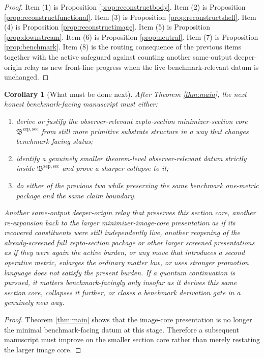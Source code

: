 \documentclass[11pt]{article}
\newcommand{\ZeptoMinSectionCore}{\mathfrak B^{\mathrm{zep,sec}}}
\newtheorem{corollary}{Corollary}
\begin{document}
\begin{proof}
Item (1) is Proposition \ref{prop:reconstructbody}. Item (2) is Proposition \ref{prop:reconstructfunctional}. Item (3) is Proposition \ref{prop:reconstructshell}. Item (4) is Proposition \ref{prop:reconstructimage}. Item (5) is Proposition \ref{prop:downstream}. Item (6) is Proposition \ref{prop:neutral}. Item (7) is Proposition \ref{prop:benchmark}. Item (8) is the routing consequence of the previous items together with the active safeguard against counting another same-output deeper-origin relay as new front-line progress when the live benchmark-relevant datum is unchanged.
\end{proof}

\begin{corollary}[What must be done next]
\label{cor:next}
After Theorem \ref{thm:main}, the next honest benchmark-facing manuscript must either:
\begin{enumerate}
    \item derive or justify the observer-relevant zepto-section minimizer-section core \(\ZeptoMinSectionCore\) from still more primitive substrate structure in a way that changes benchmark-facing status;
    \item identify a genuinely smaller theorem-level observer-relevant datum strictly inside \(\ZeptoMinSectionCore\) and prove a sharper collapse to it;
    \item do either of the previous two while preserving the same benchmark one-metric package and the same claim boundary.
\end{enumerate}
Another same-output deeper-origin relay that preserves this section core, another re-expansion back to the larger minimizer-image-core presentation as if its recovered constituents were still independently live, another reopening of the already-screened full zepto-section package or other larger screened presentations as if they were again the active burden, or any move that introduces a second operative metric, enlarges the ordinary matter law, or uses stronger promotion language does not satisfy the present burden. If a quantum continuation is pursued, it matters benchmark-facingly only insofar as it derives this same section core, collapses it further, or closes a benchmark derivation gate in a genuinely new way.
\end{corollary}

\begin{proof}
Theorem \ref{thm:main} shows that the image-core presentation is no longer the minimal benchmark-facing datum at this stage. Therefore a subsequent manuscript must improve on the smaller section core rather than merely restating the larger image core.
\end{proof}
\end{document}

